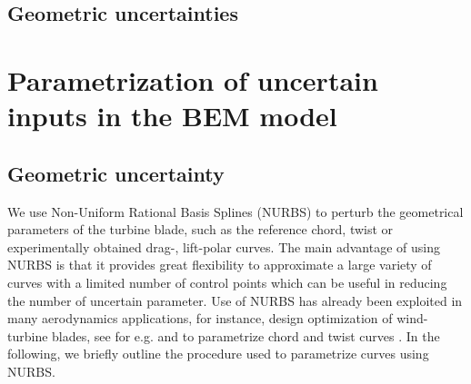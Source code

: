 \documentclass[review]{elsarticle}
\numberwithin{equation}{section}
\numberwithin{equation}{section}
\begin{document}
\subsection{Geometric uncertainties}


\section{Parametrization of uncertain inputs in the BEM model}\label{sec:parameterization}

\subsection{Geometric uncertainty}
We use Non-Uniform Rational Basis Splines (NURBS) \cite{rogers2000} to perturb the geometrical parameters of the turbine blade, such as the reference chord, twist or experimentally obtained drag-, lift-polar curves. The main advantage of using NURBS is that it provides great flexibility to approximate a large variety of curves with a limited number of control points which can be useful in reducing the number of uncertain parameter. %
Use of NURBS has already been exploited in many aerodynamics applications, for instance, design optimization of wind-turbine blades, see for e.g. \cite{Ribeiro2012,Bottasso2014} and to parametrize chord and twist curves \cite{Echeverria2017}. In the following, we briefly outline the procedure used to parametrize curves using NURBS.
\end{document}
